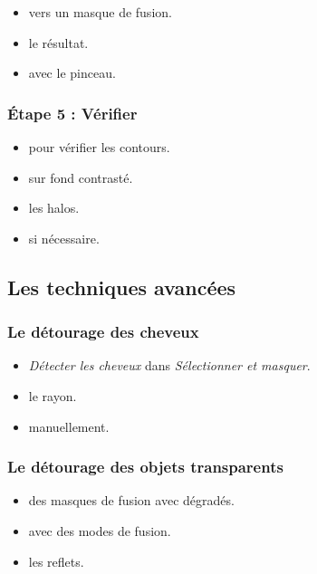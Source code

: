 \begin{itemize}
    \item {} vers un masque de fusion.
    \item {} le résultat.
    \item {} avec le pinceau.
\end{itemize}

\subsubsection{Étape 5 : Vérifier}

\begin{itemize}
    \item {} pour vérifier les contours.
    \item {} sur fond contrasté.
    \item {} les halos.
    \item {} si nécessaire.
\end{itemize}

\subsection{Les techniques avancées}

\subsubsection{Le détourage des cheveux}

\begin{itemize}
    \item {} \emph{Détecter les cheveux} dans \emph{Sélectionner et masquer}.
    \item {} le rayon.
    \item {} manuellement.
\end{itemize}

\subsubsection{Le détourage des objets transparents}

\begin{itemize}
    \item {} des masques de fusion avec dégradés.
    \item {} avec des modes de fusion.
    \item {} les reflets.
\end{itemize}

